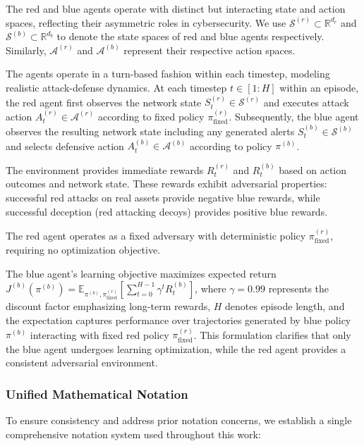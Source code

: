 \documentclass[12pt,oneside]{article}
\begin{document}
The red and blue agents operate with distinct but interacting state and action spaces, reflecting their asymmetric roles in cybersecurity. We use $\mathcal{S}^{(r)} \subset \mathbb{R}^{d_r}$ and $\mathcal{S}^{(b)} \subset \mathbb{R}^{d_b}$ to denote the state spaces of red and blue agents respectively. Similarly, $\mathcal{A}^{(r)}$ and $\mathcal{A}^{(b)}$ represent their respective action spaces.

The agents operate in a turn-based fashion within each timestep, modeling realistic attack-defense dynamics. At each timestep $t \in [1:H]$ within an episode, the red agent first observes the network state $S_t^{(r)} \in \mathcal{S}^{(r)}$ and executes attack action $A_t^{(r)} \in \mathcal{A}^{(r)}$ according to fixed policy $\pi^{(r)}_{\text{fixed}}$. Subsequently, the blue agent observes the resulting network state including any generated alerts $S_t^{(b)} \in \mathcal{S}^{(b)}$ and selects defensive action $A_t^{(b)} \in \mathcal{A}^{(b)}$ according to policy $\pi^{(b)}$.

The environment provides immediate rewards $R_t^{(r)}$ and $R_t^{(b)}$ based on action outcomes and network state. These rewards exhibit adversarial properties: successful red attacks on real assets provide negative blue rewards, while successful deception (red attacking decoys) provides positive blue rewards.

The red agent operates as a fixed adversary with deterministic policy $\pi^{(r)}_{\text{fixed}}$, requiring no optimization objective.

The blue agent's learning objective maximizes expected return $J^{(b)}(\pi^{(b)}) = \mathbb{E}_{\pi^{(b)}, \pi^{(r)}_{\text{fixed}}}\left[\sum_{t=0}^{H-1} \gamma^t R_t^{(b)}\right]$, where $\gamma = 0.99$ represents the discount factor emphasizing long-term rewards, $H$ denotes episode length, and the expectation captures performance over trajectories generated by blue policy $\pi^{(b)}$ interacting with fixed red policy $\pi^{(r)}_{\text{fixed}}$. This formulation clarifies that only the blue agent undergoes learning optimization, while the red agent provides a consistent adversarial environment.

\subsubsection{Unified Mathematical Notation}

To ensure consistency and address prior notation concerns, we establish a single comprehensive notation system used throughout this work:
\end{document}
